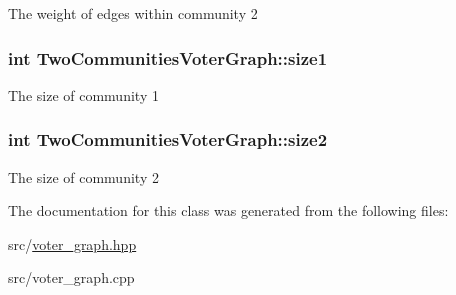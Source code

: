 The weight of edges within community 2 \hypertarget{classTwoCommunitiesVoterGraph_a3c9db0ac7e58d875ab3ce277bf74b284}{
\subsubsection[{size1}]{\setlength{\rightskip}{0pt plus 5cm}int Two\-Communities\-Voter\-Graph\-::size1}}\label{classTwoCommunitiesVoterGraph_a3c9db0ac7e58d875ab3ce277bf74b284}
The size of community 1 \hypertarget{classTwoCommunitiesVoterGraph_a8b88457f020773b984e0d8c85d9ee502}{
\subsubsection[{size2}]{\setlength{\rightskip}{0pt plus 5cm}int Two\-Communities\-Voter\-Graph\-::size2}}\label{classTwoCommunitiesVoterGraph_a8b88457f020773b984e0d8c85d9ee502}
The size of community 2 

The documentation for this class was generated from the following files\-:\begin{DoxyCompactItemize}
\item 
src/\hyperlink{voter__graph_8hpp}{voter\-\_\-graph.\-hpp}\item 
src/voter\-\_\-graph.\-cpp\end{DoxyCompactItemize}
